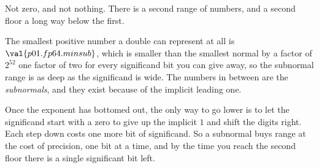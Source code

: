 \begin{fr}
\begin{ansblock}
Not zero, and not nothing. There is a second range of numbers, and a second
floor a long way below the first.
\end{ansblock}

The smallest positive number a double can represent at all is
$\val{p01.fp64.minsub}$, which is smaller than the smallest normal by a factor
of $2^{52}$ \dash{} one factor of two for every significand bit you can give
away, so the subnormal range is as deep as the significand is wide. The
numbers in between are the \emph{subnormals}, and they exist because of the
implicit leading one.

Once the exponent has bottomed out, the only way to go lower is to let the
significand start with a zero \dash{} to give up the implicit $1$ and shift the
digits right. Each step down costs one more bit of significand. So a subnormal
buys range at the cost of precision, one bit at a time, and by the time you
reach the second floor there is a single significant bit left.
\end{fr}


